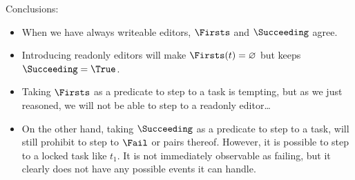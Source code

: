 Conclusions:
\begin{itemize}
  \item
    When we have always writeable editors, $\Firsts$ and $\Succeeding$ agree.
  \item
    Introducing readonly editors will make $\Firsts(t) = \nothing$ but keeps $\Succeeding = \True$.
  \item
    Taking $\Firsts$ as a predicate to step to a task is tempting,
    but as we just reasoned,
    we will not be able to step to a readonly editor\ldots
  \item
    On the other hand,
    taking $\Succeeding$ as a predicate to step to a task,
    will still prohibit to step to $\Fail$ or pairs thereof.
    However, it is possible to step to a locked task like $t_1$.
    It is not immediately observable as failing,
    but it clearly does not have any possible events it can handle.
\end{itemize}
